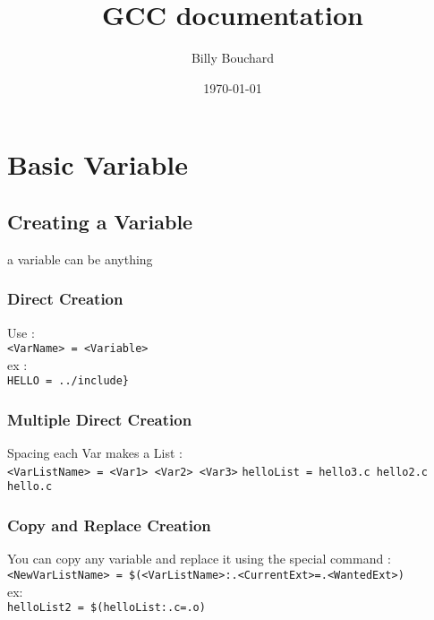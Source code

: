 \documentclass[12pt]{article}
\author{Billy Bouchard}
\title{GCC documentation}
\date{\today}
\begin{document}
\maketitle
\tableofcontents
\newpage
\section{Basic Variable}
\subsection{Creating a Variable}
a variable can be anything
\subsubsection{Direct Creation}
Use : \\
\verb|<VarName> = <Variable>|\\
ex : \\
\verb|HELLO = ../include}|

\subsubsection{Multiple Direct Creation}
Spacing each Var makes a List : \\
\verb|<VarListName> = <Var1> <Var2> <Var3>|
\verb|helloList = hello3.c hello2.c hello.c |
\subsubsection{Copy and Replace Creation}
You can copy any variable and replace it using the special command :
\verb|<NewVarListName> = $(<VarListName>:.<CurrentExt>=.<WantedExt>)|\\
ex: \\
\verb|helloList2 = $(helloList:.c=.o)|
\end{document}
